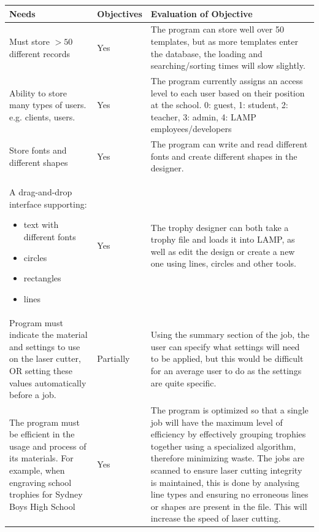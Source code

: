 \documentclass[oneside,openany,11pt,a4paper]{report}
\begin{document}
\begin{longtable}{|p{4cm}|p{2cm}|p{8cm}|}
	
	\hline
	\rowcolor{gray!50}
	\textbf{Needs} & \textbf{Objectives} & \textbf{Evaluation of Objective} \\ \hline
	
	Must store $>50$ different records & 
	Yes &
	The program can store well over 50 templates, but as more templates enter the database, the loading and searching/sorting times will slow slightly. 
	\\ \hline
	
	Ability to store many types of users. e.g. clients, users. &
	Yes &
	The program currently assigns an access level to each user based on their position at the school. 0: guest, 1: student, 2: teacher, 3: admin, 4: LAMP employees/developers 
	\\ \hline
	
	Store fonts and different shapes &
	Yes &
	The program can write and read different fonts and create different shapes in the designer.
	\\ \hline
	
	A drag-and-drop interface supporting:
	\begin{itemize}
		\itemsep0em
		\item text with different fonts
		\item circles
		\item rectangles
		\item lines
	\end{itemize} &
	Yes &
	The trophy designer can both take a trophy file and loads it into LAMP, as well as edit the design or create a new one using lines, circles and other tools. 
	\\ \hline
	
	Program must indicate the material and settings to use on the laser cutter, OR setting these values automatically before a job. &
	Partially &
	Using the summary section of the job, the user can specify what settings will need to be applied, but this would be difficult for an average user to do as the settings are quite specific. 
	\\ \hline
	
	The program must be efficient in the usage and process of its materials. For example, when engraving school trophies for Sydney Boys High School & 
	Yes &
	The program is optimized so that a single job will have the maximum level of efficiency by effectively grouping trophies together using a specialized algorithm, therefore minimizing waste. \newline The jobs are scanned to ensure laser cutting integrity is maintained, this is done by analysing line types and ensuring no erroneous lines or shapes are present in the file. This will increase the speed of laser cutting. \\ \hline
	

\end{longtable}
\end{document}
